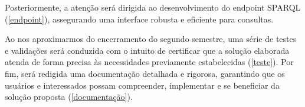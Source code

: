 Posteriormente, a atenção será dirigida ao desenvolvimento do endpoint SPARQL (\ref{endpoint}), assegurando uma interface robusta e eficiente para consultas.

Ao nos aproximarmos do encerramento do segundo semestre, uma série de testes e validações será conduzida com o intuito de certificar que a solução elaborada atenda de forma precisa às necessidades previamente estabelecidas (\ref{teste}). Por fim, será redigida uma documentação detalhada e rigorosa, garantindo que os usuários e interessados possam compreender, implementar e se beneficiar da solução proposta (\ref{documentação}).


